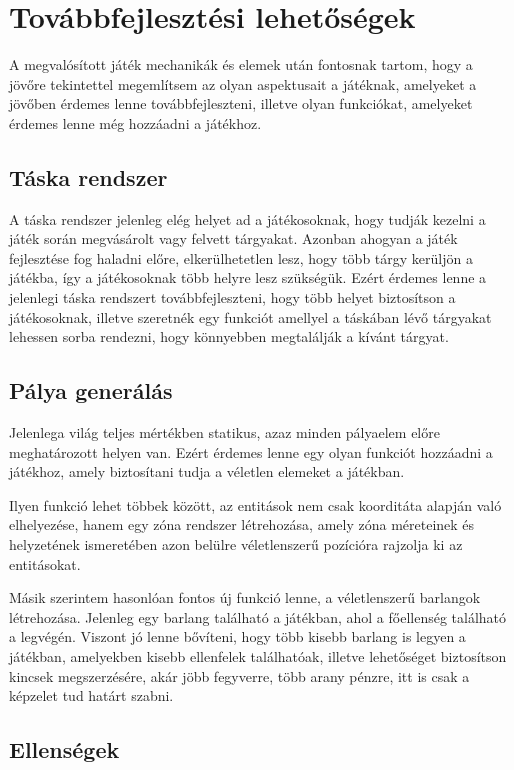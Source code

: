 \chapter{Továbbfejlesztési lehetőségek}

A megvalósított játék mechanikák és elemek után fontosnak tartom, hogy a jövőre tekintettel megemlítsem az olyan aspektusait a játéknak, amelyeket a jövőben érdemes lenne továbbfejleszteni, illetve olyan funkciókat, amelyeket érdemes lenne még hozzáadni a játékhoz.



\section{Táska rendszer}

A táska rendszer jelenleg elég helyet ad a játékosoknak, hogy tudják kezelni a játék során megvásárolt vagy felvett tárgyakat. Azonban ahogyan a játék fejlesztése fog haladni előre, elkerülhetetlen lesz, hogy több tárgy kerüljön a játékba, így a játékosoknak több helyre lesz szükségük. Ezért érdemes lenne a jelenlegi táska rendszert továbbfejleszteni, hogy több helyet biztosítson a játékosoknak, illetve szeretnék egy funkciót amellyel a táskában lévő tárgyakat lehessen sorba rendezni, hogy könnyebben megtalálják a kívánt tárgyat.

\section{Pálya generálás}
Jelenlega világ teljes mértékben statikus, azaz minden pályaelem előre meghatározott helyen van. Ezért érdemes lenne egy olyan funkciót hozzáadni a játékhoz, amely biztosítani tudja a véletlen elemeket a játékban.

Ilyen funkció lehet többek között, az entitások nem csak koorditáta alapján való elhelyezése, hanem egy zóna rendszer létrehozása, amely zóna méreteinek és helyzetének ismeretében azon belülre véletlenszerű pozícióra rajzolja ki az entitásokat.

Másik szerintem hasonlóan fontos új funkció lenne, a véletlenszerű barlangok létrehozása. Jelenleg egy barlang található a játékban, ahol a főellenség található a legvégén. Viszont jó lenne bővíteni, hogy több kisebb barlang is legyen a játékban, amelyekben kisebb ellenfelek találhatóak, illetve lehetőséget biztosítson kincsek megszerzésére, akár jöbb fegyverre, több arany pénzre, itt is csak a képzelet tud határt szabni.

\section{Ellenségek}

